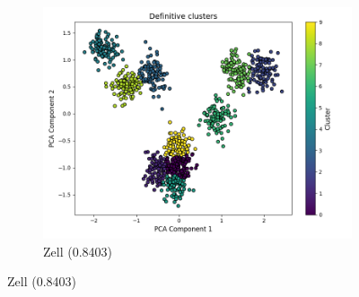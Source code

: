 \documentclass[
	10pt,
	parskip=half-,	
	paper=a4,
	english
	]{scrartcl}
\begin{document}
\begin{figure}[ht]
\begin{subfigure}[b]{0.3\textwidth}
        \includegraphics[width=\textwidth]{../data/plots/synthetic_noise_blobs_blobs_Zell_structural_0.png}
        \caption{Zell (0.8403)}
    \end{subfigure}
    
    \vspace{0.3cm}
    

\end{figure}
\end{document}
